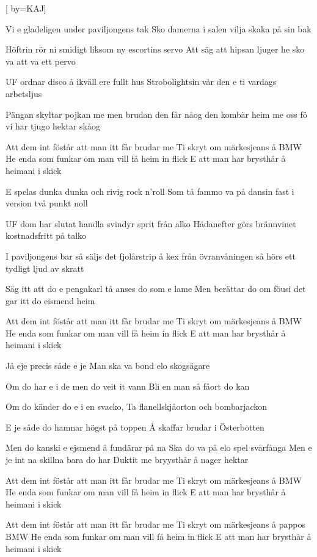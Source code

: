 

[ 		%
	by={KAJ}]						%
	

\beginverse*						%
Vi e gladeligen under paviljongens tak
Sko damerna i salen vilja skaka på sin bak

Höftrin rör ni smidigt liksom ny escortins servo
Att säg att hipsan ljuger he sko va att va ett pervo

UF ordnar disco å ikväll ere fullt hus
Strobolightsin vår den e ti vardags arbetsljus

Pängan skyltar pojkan me men brudan den får nåog
den kombär heim me oss fö vi har tjugo hektar skåog
\endverse							%

\beginchorus
Att dem int föstår att man itt får brudar me
Ti skryt om märkesjeans å BMW
He enda som funkar om man vill få heim in flick
E att man har brysthår å heimani i skick
\endchorus

\beginverse*						%
E spelas dunka dunka och rivig rock n'roll
Som tå fammo va på dansin fast i version två punkt noll

UF dom har slutat handla svindyr sprit från alko
Hädanefter görs brännvinet kostnadsfritt på talko

I paviljongens bar så säljs det fjolårstrip å kex
från övranvåningen så hörs ett tydligt ljud av skratt 

Säg itt att do e pengakarl tå anses do som e lame
Men berättar do om föusi det gar itt do eismend heim
\endverse							%

\beginchorus
Att dem int föstår att man itt får brudar me
Ti skryt om märkesjeans å BMW
He enda som funkar om man vill få heim in flick
E att man har brysthår å heimani i skick
\endchorus

\beginverse*						%
Jå eje precis såde e je
Man ska va bond elo skogsägare 

Om do har e i de men do veit it vann
Bli en man så fåort do kan

Om do känder do e i en svacko,
Ta flanellskjåorton och bombarjackon

E je såde do hamnar högst på toppen
Å skaffar brudar i Österbotten

Men do kanski e ejsmend å fundärar på na
Ska do va på elo spel svårfånga
Men e je int na skillna bara do har
Duktit me bryysthår å nager hektar
\endverse							%

\beginchorus
Att dem int föstår att man itt får brudar me
Ti skryt om märkesjeans å BMW
He enda som funkar om man vill få heim in flick
E att man har brysthår å heimani i skick
\endchorus

\beginchorus
Att dem int föstår att man itt får brudar me
Ti skryt om märkesjeans å pappos BMW
He enda som funkar om man vill få heim in flick
E att man har brysthår å heimani i skick
\endchorus

\endsong							%